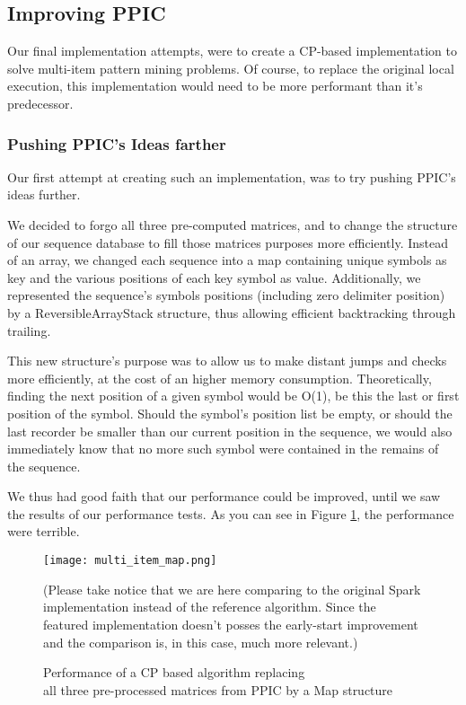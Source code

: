 \documentclass{eplmastersthesis}
\begin{document}
\subsection{Improving PPIC}

Our final implementation attempts, were to create a CP-based implementation to solve multi-item pattern mining problems. Of course, to replace the original local execution, this implementation would need to be more performant than it's predecessor.

\subsubsection{Pushing PPIC's Ideas farther}

Our first attempt at creating such an implementation, was to try pushing PPIC's ideas further. \newline

We decided to forgo all three pre-computed matrices, and to change the structure of our sequence database to fill those matrices purposes more efficiently. Instead of an array, we changed each sequence into a map containing unique symbols as key and the various positions of each key symbol as value. 
Additionally, we represented the sequence's symbols positions (including zero delimiter position) by a ReversibleArrayStack structure, thus allowing efficient backtracking through trailing. \newline

This new structure's purpose was to allow us to make distant jumps and checks more efficiently, at the cost of an higher memory consumption. Theoretically, finding the next position of a given symbol would be O(1), be this the last or first position of the symbol. Should the symbol's position list be empty, or should the last recorder be smaller than our current position in the sequence, we would also immediately know that no more such symbol were contained in the remains of the sequence. \newline

We thus had good faith that our performance could be improved, until we saw the results of our performance tests. As you can see in Figure \ref{fig:multi_map}, the performance were terrible. \newline

\begin{figure}[h]
  \centering
  \texttt{[image: multi\_item\_map.png]}
  \caption[Map based - multi\_item algorithm]{
  		Performance of a CP based algorithm replacing \\
  		all three pre-processed matrices from PPIC by a Map structure
  	\endtabular
  }
  (Please take notice that we are here comparing to the original Spark implementation instead of the reference algorithm. Since the featured implementation doesn't posses the early-start improvement and the comparison is, in this case, much more relevant.)
  \label{fig:multi_map}
\end{figure}
\end{document}
